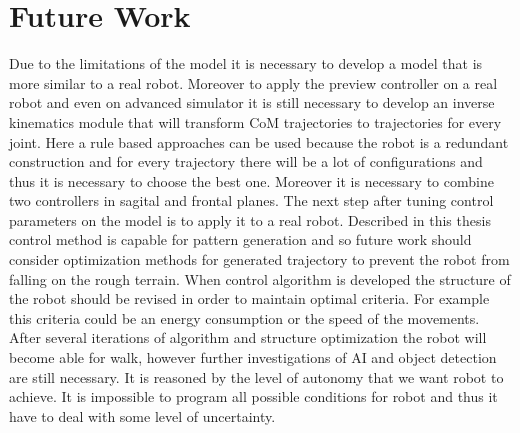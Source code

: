 \documentclass[12pt,a4paper]{report}
\begin{document}
	\chapter{Future Work}
		Due to the limitations of the model it is necessary to develop a model that is more similar to a real robot. Moreover to apply the preview controller on a real robot and even on advanced simulator it is still necessary to develop an inverse kinematics module that will transform CoM trajectories to trajectories for every joint. Here a rule based approaches can be used because the robot is a redundant construction and for every trajectory there will be a lot of configurations and thus it is necessary to choose the best one. Moreover it is necessary to combine two controllers in sagital and frontal planes.
		The next step after tuning control parameters on the model is to apply it to a real robot.
		Described in this thesis control method is capable for pattern generation and so future work should consider optimization methods for generated trajectory to prevent the robot from falling on the rough terrain.
		When control algorithm is developed the structure of the robot should be revised in order to maintain optimal criteria. For example this criteria could be an energy consumption or the speed of the movements.
		After several iterations of algorithm and structure optimization the robot will become able for walk, however further investigations of AI and object detection are still necessary. It is reasoned by the level of autonomy that we want robot to achieve. It is impossible to program  all possible conditions for robot and thus it have to deal with some level of uncertainty.
\end{document}
